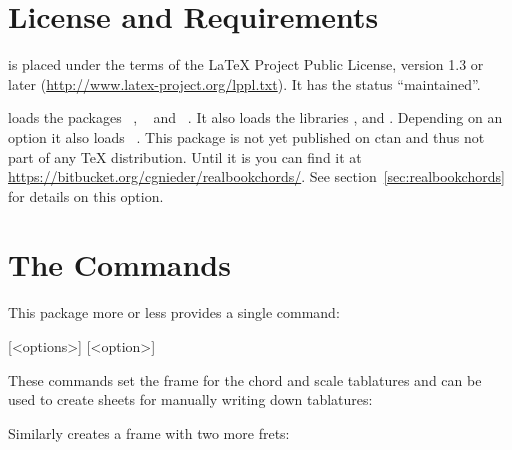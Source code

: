 \documentclass[toc=index,toc=bib]{cnpkgdoc}
\begin{document}
\section{License and Requirements}

\guitarchordschemes is placed under the terms of the \LaTeX{} Project Public License,
version 1.3 or later (\url{http://www.latex-project.org/lppl.txt}).
It has the status “maintained”.

\guitarchordschemes loads the packages \TikZ~\cite{pkg:tikz},
~\cite{pkg:etoolbox} and ~\cite{pkg:pgfopts}.
It also loads the \TikZ{} libraries ,  and .
Depending on an option it also loads ~\cite{pkg:realbookchords}.
This package is not yet published on \ac{ctan} and thus not part of any \TeX{}
distribution. Until it is you can find it at
\url{https://bitbucket.org/cgnieder/realbookchords/}.
See section~\ref{sec:realbookchords} for details on this option.

\section{The Commands}
This package more or less provides a single command:
\begin{beschreibung}
 [<options>]
 [<option>]
\end{beschreibung}
These commands set the frame for the chord and scale tablatures and can be used
to create sheets for manually writing down tablatures:
\begin{beispiel}
 \chordscheme
\end{beispiel}

Similarly  creates a frame with two more frets:
\begin{beispiel}[below]
 \scales
\end{beispiel}
\end{document}
